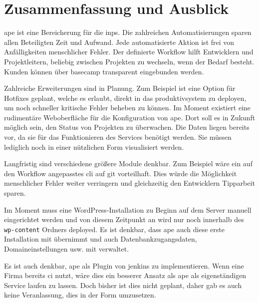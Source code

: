 



\section{Zusammenfassung und Ausblick} %
\label{sec:zusammenfassung_und_ausblick}

\gls{ape} ist eine Bereicherung für die \gls{inps}. Die zahlreichen Automatisierungen sparen allen Beteiligten Zeit und Aufwand. Jede automatisierte Aktion ist frei von Anfälligkeiten menschlicher Fehler. Der definierte Workflow hilft Entwicklern und Projektleitern, beliebig zwischen Projekten zu wechseln, wenn der Bedarf besteht. Kunden können über \gls{basecamp} transparent eingebunden werden.

Zahlreiche Erweiterungen sind in Planung. Zum Beispiel ist eine Option für Hotfixes geplant, welche es erlaubt, direkt in das \gls{produktivsystem} zu deployen, um noch schneller kritische Fehler beheben zu können. Im Moment existiert eine rudimentäre Weboberfläche für die Konfiguration von \gls{ape}. Dort soll es in Zukunft möglich sein, den Status von Projekten zu überwachen. Die Daten liegen bereits vor, da sie für das Funktionieren des Services benötigt werden. Sie müssen lediglich noch in einer nützlichen Form visualisiert werden.

Langfristig sind verschiedene größere Module denkbar. Zum Beispiel wäre ein auf den Workflow angepasstes \gls{cli} auf \gls{git} vorteilhaft. Dies würde die Möglichkeit menschlicher Fehler weiter verringern und gleichzeitig den Entwicklern Tipparbeit sparen.

Im Moment muss eine WordPress-Installation zu Beginn auf dem Server manuell eingerichtet werden und von diesem Zeitpunkt an wird nur noch innerhalb des \lstinline!wp-content! Ordners deployed. Es ist denkbar, dass \gls{ape} auch diese erste Installation mit übernimmt und auch Datenbankzugangsdaten, Domaineinstellungen usw. mit verwaltet.

Es ist auch denkbar, \gls{ape} als Plugin von \gls{jenkins} zu implementieren. Wenn eine Firma bereits \gls{ci} nutzt, wäre dies ein besserer Ansatz als \gls{ape} als eigenständigen Service laufen zu lassen. Doch bisher ist dies nicht geplant, daher gab es auch keine Veranlassung, dies in der Form umzusetzen.
